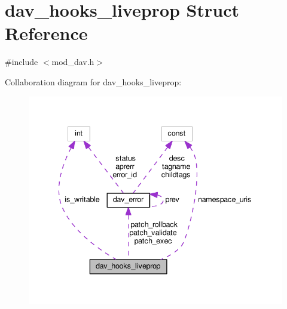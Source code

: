 \hypertarget{structdav__hooks__liveprop}{}\section{dav\+\_\+hooks\+\_\+liveprop Struct Reference}
\label{structdav__hooks__liveprop}


{\ttfamily \#include $<$mod\+\_\+dav.\+h$>$}



Collaboration diagram for dav\+\_\+hooks\+\_\+liveprop\+:
\nopagebreak
\begin{figure}[H]
\begin{center}
\leavevmode
\includegraphics[width=338pt]{structdav__hooks__liveprop__coll__graph}
\end{center}
\end{figure}

